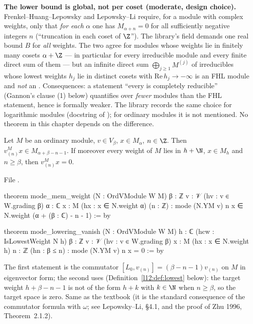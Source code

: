 \begin{warning}
\textbf{The lower bound is global, not per coset (moderate, design choice).} Frenkel--Huang--Lepowsky
and Lepowsky--Li require, for a module with complex weights, only that \emph{for each} $\alpha$ one has
$M_{\alpha+n} = 0$ for all sufficiently negative integers $n$ (``truncation in each coset of $\Z$''). The
library's field  demands one real bound $B$ for \emph{all} weights. The two agree for
modules whose weights lie in finitely many cosets $\alpha+\Z$ --- in particular for every irreducible
module and every finite direct sum of them --- but an infinite direct sum
$\bigoplus_{j\ge1}M^{(j)}$ of irreducibles whose lowest weights $h_j$ lie in distinct cosets with
$\mathrm{Re}\,h_j\to-\infty$ is an FHL module and \emph{not} an . Consequences: a
statement ``every  is completely reducible'' (Gannon's clause (1) below) quantifies over
\emph{fewer} modules than the FHL statement, hence is formally weaker. The library records the same
choice for logarithmic modules (docstring of ); for
ordinary modules it is not mentioned. No theorem in this chapter depends on the difference.
\end{warning}

\begin{lemma}\label{l12:lem:modeweight}
Let $M$ be an ordinary module, $v\in V_\beta$, $x\in M_\alpha$, $n\in\Z$. Then
$v^M_{(n)}x\in M_{\alpha+\beta-n-1}$. If moreover every weight of $M$ lies in $h+\N$, $x\in M_h$ and
$n\ge\beta$, then $v^M_{(n)}x = 0$.
\end{lemma}
\noindent File .
\begin{leancode}
theorem mode_mem_weight (N : OrdVModule W M) {β : ℤ} {v : 𝒱} (hv : v ∈ W.grading β)
    {α : ℂ} {x : M} (hx : x ∈ N.weight α) (n : ℤ) :
    mode (N.YM v) n x ∈ N.weight (α + (β : ℂ) - n - 1) := by

theorem mode_lowering_vanish (N : OrdVModule W M) {h : ℂ} (hcw : IsLowestWeight N h)
    {β : ℤ} {v : 𝒱} (hv : v ∈ W.grading β) {x : M} (hx : x ∈ N.weight h) {n : ℤ}
    (hn : β ≤ n) : mode (N.YM v) n x = 0 := by
\end{leancode}

\begin{dictionary}
The first statement is the commutator $[L_0, v_{(n)}] = (\beta-n-1)v_{(n)}$ on $M$ in eigenvector form;
the second uses  (Definition~\ref{l12:def:lowest} below): the target weight
$h+\beta-n-1$ is not of the form $h+k$ with $k\in\N$ when $n\ge\beta$, so the target space is zero.
Same as the textbook (it is the standard consequence of the commutator formula with $\omega$; see Lepowsky--Li, §4.1, and the proof of Zhu 1996, Theorem~2.1.2).
\end{dictionary}

